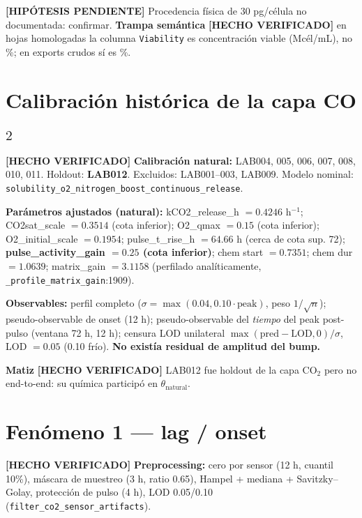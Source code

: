 \documentclass[11pt,a4paper]{article}
\newcommand{\code}[1]{\nolinkurl{#1}}
\newcommand{\hecho}{\textcolor{hecho}{\textbf{[HECHO VERIFICADO]}}}
\newcommand{\hipo}{\textcolor{hipo}{\textbf{[HIP\'OTESIS PENDIENTE]}}}
\newcommand{\ruta}[1]{\texttt{\small #1}}
\begin{document}
\hipo{} Procedencia f\'isica de 30 pg/c\'elula no documentada: confirmar. \textbf{Trampa sem\'antica} \hecho{} en hojas homologadas la columna \ruta{Viability} es concentraci\'on viable (Mc\'el/mL), no \%; en exports crudos s\'i es \%.

\section{Calibraci\'on hist\'orica de la capa CO$_2$}

\hecho{} \textbf{Calibraci\'on natural:} LAB004, 005, 006, 007, 008, 010, 011. Holdout: \textbf{LAB012}. Excluidos: LAB001--003, LAB009. Modelo nominal: \code{solubility_o2_nitrogen_boost_continuous_release}.

\textbf{Par\'ametros ajustados (natural):} kCO2\_release\_h $=0.4246$ h$^{-1}$; CO2sat\_scale $=0.3514$ (cota inferior); O2\_qmax $=0.15$ (cota inferior); O2\_initial\_scale $=0.1954$; pulse\_t\_rise\_h $=64.66$ h (cerca de cota sup. 72); \textbf{pulse\_activity\_gain $=0.25$ (cota inferior)}; chem start $=0.7351$; chem dur $=1.0639$; matrix\_gain $=3.1158$ (perfilado anal\'iticamente, \ruta{\_profile\_matrix\_gain}:1909).

\textbf{Observables:} perfil completo ($\sigma=\max(0.04, 0.10\cdot\text{peak})$, peso $1/\sqrt{n}$); pseudo-observable de onset (12 h); pseudo-observable del \emph{tiempo} del peak post-pulso (ventana 72 h, 12 h); censura LOD unilateral $\max(\mathrm{pred}-\mathrm{LOD},0)/\sigma$, LOD $=0.05$ (0.10 fr\'io). \textbf{No exist\'ia residual de amplitud del bump.}

\textbf{Matiz} \hecho{} LAB012 fue holdout de la capa CO$_2$ pero no end-to-end: su qu\'imica particip\'o en $\theta_{\mathrm{natural}}$.

\section{Fen\'omeno 1 --- lag / onset}

\hecho{} \textbf{Preprocessing:} cero por sensor (12 h, cuantil 10\%), m\'ascara de muestreo (3 h, ratio 0.65), Hampel + mediana + Savitzky--Golay, protecci\'on de pulso (4 h), LOD 0.05/0.10 (\ruta{filter\_co2\_sensor\_artifacts}).
\end{document}
